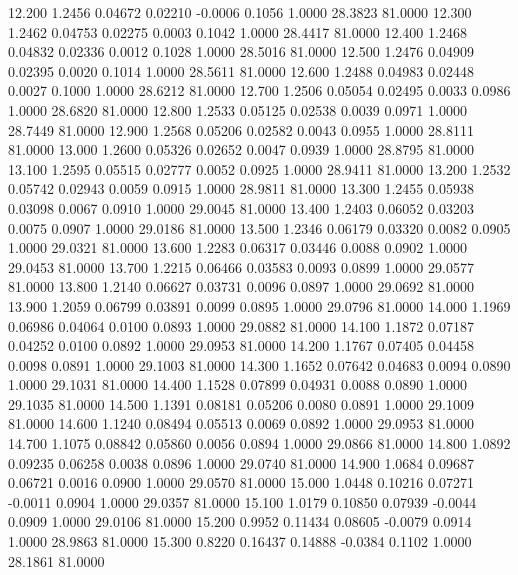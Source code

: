   12.200   1.2456   0.04672   0.02210  -0.0006   0.1056   1.0000  28.3823  81.0000
  12.300   1.2462   0.04753   0.02275   0.0003   0.1042   1.0000  28.4417  81.0000
  12.400   1.2468   0.04832   0.02336   0.0012   0.1028   1.0000  28.5016  81.0000
  12.500   1.2476   0.04909   0.02395   0.0020   0.1014   1.0000  28.5611  81.0000
  12.600   1.2488   0.04983   0.02448   0.0027   0.1000   1.0000  28.6212  81.0000
  12.700   1.2506   0.05054   0.02495   0.0033   0.0986   1.0000  28.6820  81.0000
  12.800   1.2533   0.05125   0.02538   0.0039   0.0971   1.0000  28.7449  81.0000
  12.900   1.2568   0.05206   0.02582   0.0043   0.0955   1.0000  28.8111  81.0000
  13.000   1.2600   0.05326   0.02652   0.0047   0.0939   1.0000  28.8795  81.0000
  13.100   1.2595   0.05515   0.02777   0.0052   0.0925   1.0000  28.9411  81.0000
  13.200   1.2532   0.05742   0.02943   0.0059   0.0915   1.0000  28.9811  81.0000
  13.300   1.2455   0.05938   0.03098   0.0067   0.0910   1.0000  29.0045  81.0000
  13.400   1.2403   0.06052   0.03203   0.0075   0.0907   1.0000  29.0186  81.0000
  13.500   1.2346   0.06179   0.03320   0.0082   0.0905   1.0000  29.0321  81.0000
  13.600   1.2283   0.06317   0.03446   0.0088   0.0902   1.0000  29.0453  81.0000
  13.700   1.2215   0.06466   0.03583   0.0093   0.0899   1.0000  29.0577  81.0000
  13.800   1.2140   0.06627   0.03731   0.0096   0.0897   1.0000  29.0692  81.0000
  13.900   1.2059   0.06799   0.03891   0.0099   0.0895   1.0000  29.0796  81.0000
  14.000   1.1969   0.06986   0.04064   0.0100   0.0893   1.0000  29.0882  81.0000
  14.100   1.1872   0.07187   0.04252   0.0100   0.0892   1.0000  29.0953  81.0000
  14.200   1.1767   0.07405   0.04458   0.0098   0.0891   1.0000  29.1003  81.0000
  14.300   1.1652   0.07642   0.04683   0.0094   0.0890   1.0000  29.1031  81.0000
  14.400   1.1528   0.07899   0.04931   0.0088   0.0890   1.0000  29.1035  81.0000
  14.500   1.1391   0.08181   0.05206   0.0080   0.0891   1.0000  29.1009  81.0000
  14.600   1.1240   0.08494   0.05513   0.0069   0.0892   1.0000  29.0953  81.0000
  14.700   1.1075   0.08842   0.05860   0.0056   0.0894   1.0000  29.0866  81.0000
  14.800   1.0892   0.09235   0.06258   0.0038   0.0896   1.0000  29.0740  81.0000
  14.900   1.0684   0.09687   0.06721   0.0016   0.0900   1.0000  29.0570  81.0000
  15.000   1.0448   0.10216   0.07271  -0.0011   0.0904   1.0000  29.0357  81.0000
  15.100   1.0179   0.10850   0.07939  -0.0044   0.0909   1.0000  29.0106  81.0000
  15.200   0.9952   0.11434   0.08605  -0.0079   0.0914   1.0000  28.9863  81.0000
  15.300   0.8220   0.16437   0.14888  -0.0384   0.1102   1.0000  28.1861  81.0000
